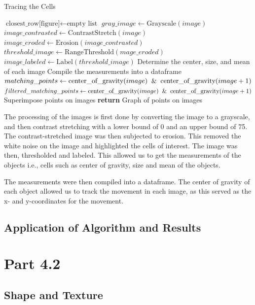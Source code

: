 \documentclass{article}
\begin{document}
\begin{algorithm}[h!]
\caption{Tracing the Cells}\label{cell-trace}
\begin{algorithmic}[1]
    \State $\text{closest\_row[figure]} \gets \text{empty list}$
        \State $gray\_image \gets \text{Grayscale}(image)$
        \State $image\_contrasted \gets \text{ContrastStretch}(image)$
        \State $image\_eroded \gets \text{Erosion}(image\_contrasted)$
        \State $threshold\_image \gets \text{RangeThreshold}(mage\_eroded)$
        \State $image\_labeled \gets \text{Label}(threshold\_image)$
        \State Determine the center, size, and mean of each image
    \EndFor
    \State Compile the measurements into a dataframe
        \State $matching\_points \gets \text{center\_of\_gravity}(image) \And \text{center\_of\_gravity}(image+1)$
        \State $filtered\_matching\_points \gets \text{center\_of\_gravity}(image) \And \text{center\_of\_gravity}(image+1)$
        \State Superimpose points on images
    \EndFor
    \State \textbf{return} Graph of points on images
\EndProcedure
\end{algorithmic}
\end{algorithm}

\par The processing of the images is first done by converting the image to a grayscale, and then contrast stretching with a lower bound of 0 and an upper bound of 75. The contrast-stretched image was then subjected to erosion. This removed the white noise on the image and highlighted the cells of interest. The image was then, thresholded and labeled. This allowed us to get the measurements of the objects i.e., cells such as center of gravity, size and mean of the objects. 
\par The measurements were then compiled into a dataframe. The center of gravity of each object allowed us to track the movement in each image, as this served as the x- and y-coordinates for the movement. 
\subsection*{Application of Algorithm and Results}

\section*{Part 4.2}
\subsection*{Shape and Texture}
\end{document}
